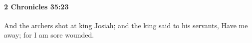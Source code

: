 
		\paragraph{2 Chronicles 35:23} %
			\label{2CHRONICLES-35-23}

			And the archers shot at king Josiah; and the king said to his servants, Have me away; for I am sore wounded.


